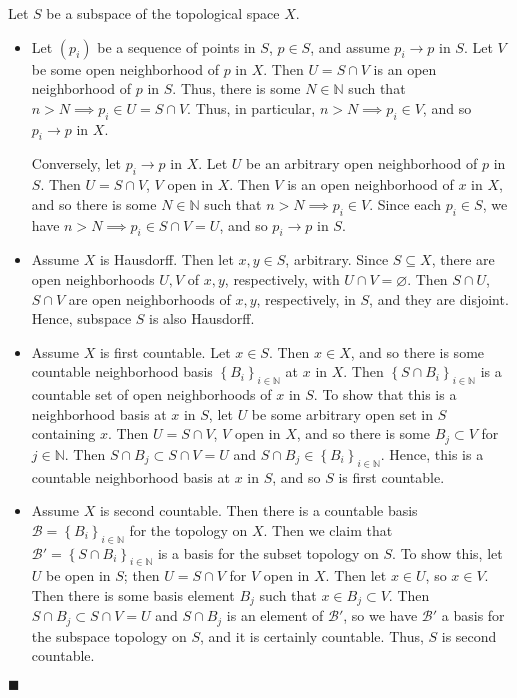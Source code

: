 \documentclass[12pt]{article}
\renewcommand{\qed}{\hfill$\blacksquare$}
\renewenvironment{proof}{\begin{addmargin}[1em]{0em}\begin{newproof}}{\end{newproof}\end{addmargin}\qed}
\begin{document}
\begin{proof}
Let $S$ be a subspace of the topological space $X$.
\begin{itemize}
	\item Let $\left(p_i\right)$ be a sequence of points in $S$, $p\in S$, and assume $p_i\rightarrow p$ in $S$. Let $V$ be some open neighborhood of $p$ in $X$. Then $U = S\cap V$ is an open neighborhood of $p$ in $S$. Thus, there is some $N\in \mathbb{N}$ such that $n>N \implies p_i \in U = S\cap V$. Thus, in particular, $n>N \implies p_i \in V$, and so $p_i \rightarrow p$ in $X$.

	Conversely, let $p_i \rightarrow p$ in $X$. Let $U$ be an arbitrary open neighborhood of $p$ in $S$. Then $U=S\cap V$, $V$ open in $X$. Then $V$ is an open neighborhood of $x$ in $X$, and so there is some $N\in \mathbb{N}$ such that $n>N\implies p_i \in V$. {\color{red} Since each $p_i\in S$}, we have $ n> N \implies p_i \in S\cap V = U$, and so $p_i\rightarrow p$ in $S$.
	\item Assume $X$ is Hausdorff. Then let $x,y \in S$, arbitrary. Since $S\subseteq X$, there are open neighborhoods $U,V$ of $x,y$, respectively, with $U\cap V=\varnothing$. Then $S\cap U$, $S\cap V$ are open neighborhoods of $x,y$, respectively, in $S$, and they are disjoint. Hence, subspace $S$ is also Hausdorff.
	\item Assume $X$ is first countable. Let $x\in S$. Then $x \in X$, and so there is some countable neighborhood basis $\left\{B_i\right\}_{i\in \mathbb{N}}$ at $x$ in $X$. Then $\left\{S\cap B_i\right\}_{i\in\mathbb{N}}$ is a countable set of open neighborhoods of $x$ in $S$. To show that this is a neighborhood basis at $x$ in $S$, let $U$ be some arbitrary open set in $S$ containing $x$. Then $U = S\cap V$, $V$ open in $X$, and so there is some $B_j \subset V$ for $j\in \mathbb{N}$. Then $S\cap B_j \subset S\cap V = U$ and $S\cap B_j \in \left\{B_i\right\}_{i\in \mathbb{N}}$. Hence, this is a countable neighborhood basis at $x$ in $S$, and so $S$ is first countable.
	\item Assume $X$ is second countable. Then there is a countable basis $\mathcal{B} = \left\{B_i\right\}_{i\in \mathbb{N}}$ for the topology on $X$. Then we claim that $\mathcal{B}' = \left\{S\cap B_i\right\}_{i \in \mathbb{N}}$ is a basis for the subset topology on $S$. To show this, let $U$ be open in $S$; then $U=S\cap V$ for $V$ open in $X$. Then let $x \in U$, so $x\in V$. Then there is some basis element $B_j$ such that $x \in B_j \subset V$. Then $S\cap B_j \subset S\cap V = U $ and $S\cap B_j$ is an element of $\mathcal{B}'$, so we have $\mathcal{B}'$ a basis for the subspace topology on $S$, and it is certainly countable. Thus, $S$ is second countable.
\end{itemize}
\end{proof}
\end{document}
